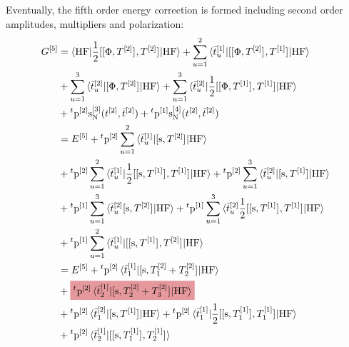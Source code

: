 Eventually, the fifth order energy correction is formed including second order
amplitudes, multipliers and polarization:
\begin{equation}\label{eq:pted-mbpt-5th}
  \begin{aligned}
    G^{[5]} &=
    \braket{\mathrm{HF} | \frac{1}{2}
    \commutator{\commutator{\Phi}{T^{[2]}}}{T^{[2]}}
    | \mathrm{HF}}
    +
    \sum_{u=1}^2\braket{\tbar{u}^{[1]}|
    \commutator{\commutator{\Phi}{T^{[2]}}}{T^{[1]}}
    | \mathrm{HF}}
    \\
    &+
    \sum_{u=1}^3\braket{\tbar{u}^{[2]}|
      \commutator{\Phi}{T^{[2]}}
    | \mathrm{HF}}
    +
    \sum_{u=1}^3\braket{\tbar{u}^{[2]}|
    \frac{1}{2}
    \commutator{\commutator{\Phi}{T^{[1]}}}{T^{[1]}}
    | \mathrm{HF}} \\
    &+ {}^t\p^{[2]}\s_{\mathrm{N}}^{[3]}(\tamp{}^{[2]}, \tbar{}^{[2]})
    + {}^t\p^{[1]}\s_{\mathrm{N}}^{[4]}(\tamp{}^{[2]}, \tbar{}^{[2]}) \\
    &= E^{[5]}
    + {}^t\p^{[2]}
    \sum_{u=1}^2\braket{\tbar{u}^{[1]} |
    \commutator{\s}{T^{[2]}} | \mathrm{HF}} \\
    &+ {}^t\p^{[2]}
    \sum_{u=1}^2\braket{\tbar{u}^{[1]} |
    \frac{1}{2}\commutator{\commutator{\s}{T^{[1]}}}{T^{[1]}}
    | \mathrm{HF}}
    + {}^t\p^{[2]}
    \sum_{u=1}^3\braket{ \tbar{u}^{[2]}
                                 | \commutator{\s}{T^{[1]}} | \mathrm{HF}}
    \\
    &+ {}^t\p^{[1]}
    \sum_{u=1}^3\braket{ \tbar{u}^{[2]}
    \commutator{\s}{T^{[2]}} | \mathrm{HF}}
    + {}^t\p^{[1]}
    \sum_{u=1}^3\braket{ \tbar{u}^{[2]}
    \frac{1}{2}\commutator{\commutator{\s}{T^{[1]}}}{T^{[1]}}
    | \mathrm{HF}} \\
    &+ {}^t\p^{[1]}
    \sum_{u=1}^2\braket{\tbar{u}^{[1]} |
    \commutator{\commutator{\s}{T^{[1]}}}{T^{[2]}}
    | \mathrm{HF}}
    \\
  &= E^{[5]}
    + {}^t\p^{[2]}\braket{\tbar{1}^{[1]} | \commutator{\s}{T_1^{[2]} +
    T_2^{[2]}} | \mathrm{HF}} \\
    &+ \highlight{PMS1797}{
    {}^t\p^{[2]}\braket{\tbar{2}^{[1]} | \commutator{\s}{T_2^{[2]} + T_3^{[2]}} | \mathrm{HF}}
    } \\
    &+ {}^t\p^{[2]}\braket{\tbar{1}^{[2]} | \commutator{\s}{T^{[1]}} | \mathrm{HF}}
    + {}^t\p^{[2]}
    \braket{\tbar{1}^{[1]} |
    \frac{1}{2}\commutator{\commutator{\s}{T_1^{[1]}}}{T_1^{[1]}}
    | \mathrm{HF}} \\
    &+ {}^t\p^{[2]}
    \braket{\tbar{2}^{[1]} |
    \commutator{\commutator{\s}{T_1^{[1]}}}{T_2^{[1]}}
}
\end{aligned}
\end{equation}
